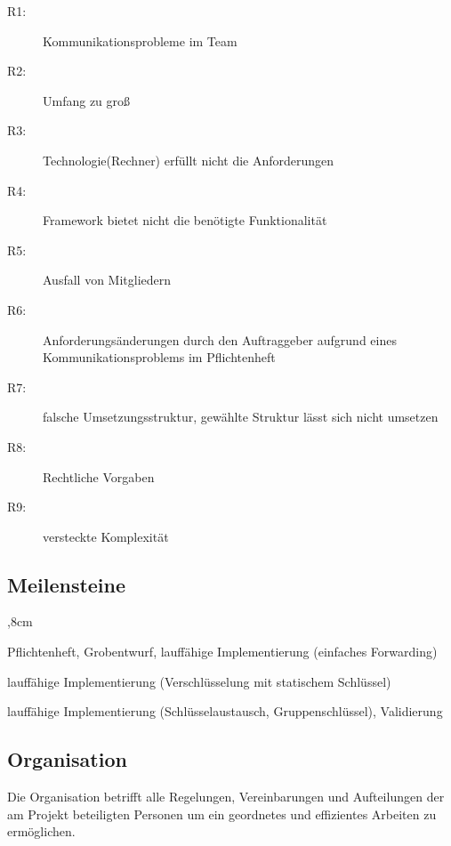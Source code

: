 \begin{description}
	\item[R1:] Kommunikationsprobleme im Team
	\item[R2:] Umfang zu groß
	\item[R3:] Technologie(Rechner) erfüllt nicht die Anforderungen
	\item[R4:] Framework bietet nicht die benötigte Funktionalität
	\item[R5:] Ausfall von Mitgliedern 
	\item[R6:] Anforderungsänderungen durch den Auftraggeber aufgrund eines Kommunikationsproblems im Pflichtenheft
	\item[R7:] falsche Umsetzungsstruktur, gewählte Struktur lässt sich nicht umsetzen
	\item[R8:] Rechtliche Vorgaben
	\item[R9:] versteckte Komplexität
\end{description}

\clearpage

\subsection{Meilensteine}
\begin{description}
	,8cm
	\item[Erster Meilenstein:] Pflichtenheft, Grobentwurf, lauffähige Implementierung (einfaches Forwarding)
	
	\item[Zweiter Meilenstein:] lauffähige Implementierung (Verschlüsselung mit statischem Schlüssel)
	
	\item[Dritter Meilenstein:] lauffähige Implementierung (Schlüsselaustausch, Gruppenschlüssel), Validierung
\end{description}



\subsection{Organisation}

Die Organisation betrifft alle Regelungen, Vereinbarungen und Aufteilungen der am Projekt beteiligten Personen um ein geordnetes und effizientes Arbeiten zu ermöglichen.


